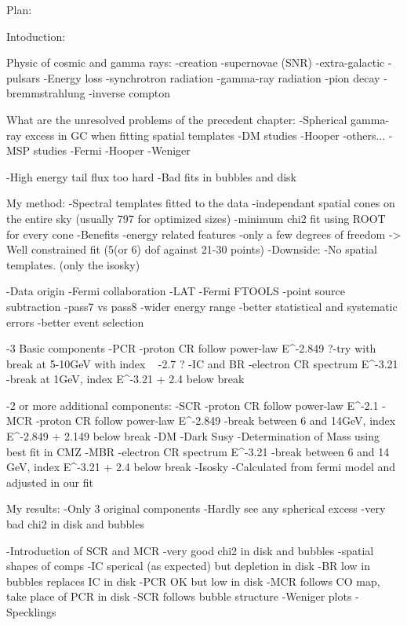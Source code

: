 Plan:

Intoduction:

Physic of cosmic and gamma rays:
	-creation
		-supernovae (SNR)
		-extra-galactic
		-pulsars
	-Energy loss
		-synchrotron radiation		
		-gamma-ray radiation
			-pion decay
			-bremmstrahlung
			-inverse compton

What are the unresolved problems of the precedent chapter:
	-Spherical gamma-ray excess in GC when fitting spatial templates
		-DM studies
			-Hooper
			-others...
		-MSP studies
			-Fermi
			-Hooper
			-Weniger

	-High energy tail flux too hard
	-Bad fits in bubbles and disk
	
	
My method:
	-Spectral templates fitted to the data
		-independant spatial cones on the entire sky (usually 797 for optimized sizes)
		-minimum chi2 fit using ROOT for every cone
		-Benefits
			-energy related features
			-only a few degrees of freedom -> Well constrained fit (5(or 6) dof against 21-30 points)
		-Downside:
			-No spatial templates. (only the isosky)
			
	
	-Data origin
		-Fermi collaboration
		-LAT
		-Fermi FTOOLS
		-point source subtraction
		-pass7 vs pass8
			-wider energy range
			-better statistical and systematic errors
			-better event selection
		

	-3 Basic components
		-PCR
			-proton CR follow power-law E^-2.849
			?-try with break at 5-10GeV with index ~ -2.7 ?
		-IC and BR
			-electron CR spectrum E^-3.21
			-break at 1GeV, index E^-3.21 + 2.4 below break
		
	
	-2 or more additional components:
		-SCR
			-proton CR follow power-law E^-2.1
		-MCR
			-proton CR follow power-law E^-2.849
			-break between 6 and 14GeV, index E^-2.849 + 2.149 below break
		-DM
			-Dark Susy
			-Determination of Mass using best fit in CMZ
		-MBR
			-electron CR spectrum E^-3.21
			-break between 6 and 14 GeV, index E^-3.21 + 2.4 below break
	-Isosky
		-Calculated from fermi model and adjusted in our fit




My results:
	-Only 3 original components
		-Hardly see any spherical excess
		-very bad chi2 in disk and bubbles

	-Introduction of SCR and MCR
		-very good chi2 in disk and bubbles
		-spatial shapes of comps
			-IC sperical (as expected) but depletion in disk
			-BR low in bubbles replaces IC in disk
			-PCR OK but low in disk
			-MCR follows CO map, take place of PCR in disk
			-SCR follows bubble structure
		-Weniger plots
		-Specklings

